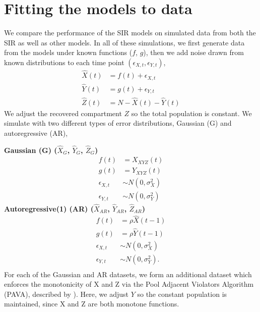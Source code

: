 \documentclass[12pt]{article}
\begin{document}

\section{Fitting the models to data}\label{sec:sim-res}

We compare the performance of the SIR models on simulated data from both the SIR as well as other models. In all of these simulations, we first generate data from the models under known functions ($f$, $g$), then we add noise drawn from known distributions to each time point $(\epsilon_{X,t}, \epsilon_{Y,t})$,
\begin{align}\label{eq:sim-models}
  \hat{X}(t) &= f(t) + \epsilon_{X,t} \\
  \hat{Y}(t) &= g(t) + \epsilon_{Y,t} \nonumber\\
  \hat{Z}(t) &= N - \hat{X}(t) - \hat{Y}(t)\nonumber 
\end{align}
We adjust the recovered compartment $Z$ so the total population is constant. 
We simulate with two different types of error distributions, Gaussian (G) and autoregressive (AR),

\noindent \textbf{Gaussian (G) ($\hat{X}_{G}$, $\hat{Y}_{G}$, $\hat{Z}_{G}$)}
\begin{align*}
  f(t) &= X_{XYZ}(t) \\
  g(t) &= Y_{XYZ}(t) \\
  \epsilon_{X,t} &\sim N(0, \sigma_X^2) \\
  \epsilon_{Y,t} &\sim N(0, \sigma_Y^2)
\end{align*}
\textbf{Autoregressive(1) (AR) ($\hat{X}_{AR}$, $\hat{Y}_{AR}$, $\hat{Z}_{AR}$)}
\begin{align*}
  f(t) &= \rho \hat{X}(t-1) \\
  g(t) &= \rho \hat{Y}(t-1) \\
  \epsilon_{X,t} &\sim N(0, \sigma_X^2) \\
  \epsilon_{Y,t} &\sim N(0, \sigma_Y^2).\\
\end{align*}
For each of the Gaussian and AR datasets, we form an additional dataset which enforces the monotonicity of X and Z via the Pool Adjacent Violators Algorithm (PAVA), described by \cite{friedman1984}).  Here, we adjust $Y$ so the constant population is maintained, since X and Z are both monotone functions.
\end{document}
